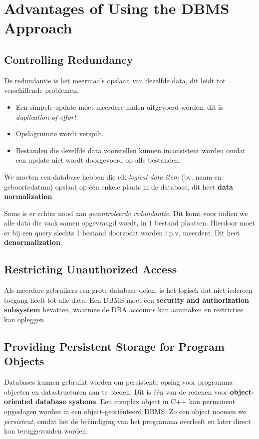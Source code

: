 \section{Advantages of Using the DBMS Approach}
\subsection{Controlling Redundancy}
De redundantie is het meermaals opslaan van dezelfde data, dit leidt tot verschillende problemen.
\begin{itemize}
\item Een simpele update moet meerdere malen uitgevoerd worden, dit is \textit{duplication of effort}.
\item Opslagruimte wordt verspilt.
\item Bestanden die dezelfde data voorstellen kunnen inconsistent worden omdat een update niet wordt doorgevoerd op alle bestanden.
\end{itemize}
We moeten een database hebben die elk \textit{logical data item} (bv. naam en geboortedatum) opslaat op \'e\'en enkele plaats in de database, dit heet \textbf{data normalization}.

Soms is er echter nood aan \textit{gecontroleerde redundantie}. Dit komt voor indien we alle data die vaak samen opgevraagd wordt, in 1 bestand plaatsen. Hierdoor moet er bij een query slechts 1 bestand doorzocht worden i.p.v. meerdere. Dit heet \textbf{denormalization}.

\subsection{Restricting Unauthorized Access}
Als meerdere gebruikers een grote database delen, is het logisch dat niet iedereen toegang heeft tot alle data. Een DBMS moet een \textbf{security and authorization subsystem} bevatten, waarmee de DBA accounts kan aanmaken en restricties kan opleggen. 

\subsection{Providing Persistent Storage for Program Objects}
Databases kunnen gebruikt worden om persistente opslag voor programma-objecten en datastructuren aan te bieden. Dit is \'e\'en van de redenen voor \textbf{object-oriented database systems}. Een complex object in C++ kan permanent opgeslagen worden in een object-geori\"enteerd DBMS. Zo een object noemen we \textit{persistent}, omdat het de be\"eindiging van het programma overleeft en later direct kan teruggevonden worden.

